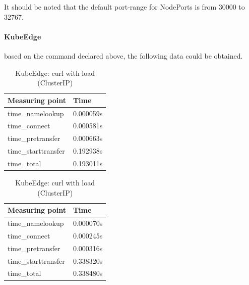 \documentclass[MSC,Master,english]{twbook}%
\begin{document}
It should be noted that the default port-range for NodePorts is from 30000 to 32767.

\paragraph{KubeEdge} based on the command declared above, the following data could be obtained.

\begin{table}[ht]
    \begin{center}
        \begin{minipage}{.49\linewidth}
            \begin{center}
                \begin{tabular}{|l|l|}
                    \hline
                    Measuring point & Time \\
                    \hline
                    time\_namelookup & 0.000059s \\
                    time\_connect & 0.000581s \\
                    time\_pretransfer & 0.000663s \\
                    time\_starttransfer & 0.192938s \\
                    \hline
                    time\_total & 0.193011s \\
                    \hline
                \end{tabular}
                \caption{KubeEdge: curl no load (ClusterIP)}
                \label{tab:ke-con-noload}
            \end{center}
        \end{minipage}
        \begin{minipage}{.49\linewidth}
            \begin{center}
                \begin{tabular}{|l|l|}
                    \hline
                    Measuring point & Time \\
                    \hline
                    time\_namelookup & 0.000070s \\
                    time\_connect & 0.000245s \\
                    time\_pretransfer & 0.000316s \\
                    time\_starttransfer & 0.338320s \\
                    \hline
                    time\_total & 0.338480s \\
                    \hline
                \end{tabular}
                \caption{KubeEdge: curl with load (ClusterIP)}
                \label{tab:ke-con-load}
            \end{center}
        \end{minipage}
    \end{center}
\end{table}
\end{document}
